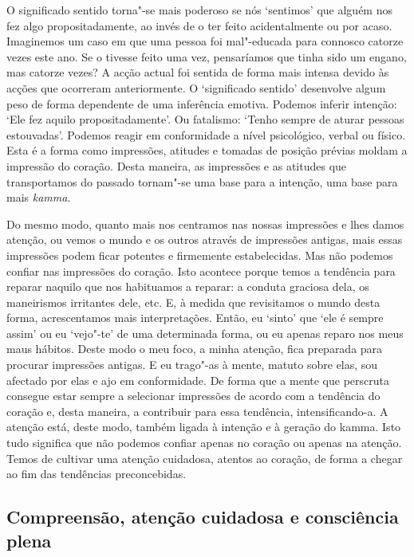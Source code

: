 O significado sentido torna"-se mais poderoso se nós `sentimos' que alguém nos
fez algo propositadamente, ao invés de o ter feito acidentalmente ou por acaso.
Imaginemos um caso em que uma pessoa foi mal"-educada para connosco catorze vezes
este ano. Se o tivesse feito uma vez, pensaríamos que tinha sido um engano, mas
catorze vezes? A acção actual foi sentida de forma mais intensa devido às acções
que ocorreram anteriormente. O `significado sentido' desenvolve algum peso de
forma dependente de uma inferência emotiva. Podemos inferir intenção: `Ele fez
aquilo propositadamente'. Ou fatalismo: `Tenho sempre de aturar pessoas
estouvadas'. Podemos reagir em conformidade a nível psicológico, verbal ou
físico. Esta é a forma como impressões, atitudes e tomadas de posição prévias
moldam a impressão do coração. Desta maneira, as impressões e as atitudes que
transportamos do passado tornam"-se uma base para a intenção, uma base para mais
\emph{kamma}.

Do mesmo modo, quanto mais nos centramos nas nossas impressões e lhes damos
atenção, ou vemos o mundo e os outros através de impressões antigas, mais essas
impressões podem ficar potentes e firmemente estabelecidas. Mas não podemos
confiar nas impressões do coração. Isto acontece porque temos a tendência para
reparar naquilo que nos habituamos a reparar: a conduta graciosa dela, os
maneirismos irritantes dele, etc. E, à medida que revisitamos o mundo desta
forma, acrescentamos mais interpretações. Então, eu `sinto' que `ele é sempre
assim' ou eu `vejo"-te' de uma determinada forma, ou eu apenas reparo nos meus
maus hábitos. Deste modo o meu foco, a minha atenção, fica preparada para
procurar impressões antigas. E eu trago"-as à mente, matuto sobre elas, sou
afectado por elas e ajo em conformidade. De forma que a mente que perscruta
consegue estar sempre a selecionar impressões de acordo com a tendência do
coração e, desta maneira, a contribuir para essa tendência, intensificando-a. A
atenção está, deste modo, também ligada à intenção e à geração do kamma. Isto
tudo significa que não podemos confiar apenas no coração ou apenas na atenção.
Temos de cultivar uma atenção cuidadosa, atentos ao coração, de forma a chegar
ao fim das tendências preconcebidas.

\subsection{Compreensão, atenção cuidadosa e consciência plena}


